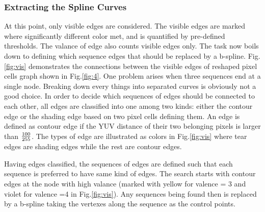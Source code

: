 \documentclass{article}
\begin{document}
\subsubsection{Extracting the Spline Curves}
At this point, only visible edges are considered. The visible edges are marked where significantly different color met, and is quantified by pre-defined thresholds. The valance of edge also counts visible edges only. The task now boils down to defining which sequence edges that should be replaced by a b-spline.
Fig.\ref{fig:vis} demonstrates the connections between the visible edges of reshaped pixel cells graph shown in Fig.\ref{fig:4}. One problem arises when three sequences end at a single node. Breaking down every things into separated curves is obviously not a good choice. In order to decide which sequences of edges should be connected to each other, all edges are classified into one among two kinds: either the contour edge or the shading edge based on two pixel cells defining them. An edge is defined as contour edge if the YUV distance of their two belonging pixels is larger than $100\over 255$. The types of edge are illustrated as colors in Fig.\ref{fig:vis} where tear edges are shading edges while the rest are contour edges. 

Having edges classified, the sequences of edges are defined such that each sequence is preferred to have same kind of edges. The search starts with contour edges at the node with high valance (marked with yellow for valence = 3 and violet for valence =4 in Fig.\ref{fig:vis}). Any sequences being found then is replaced by a b-spline taking the vertexes along the sequence as the control points.
\end{document}

